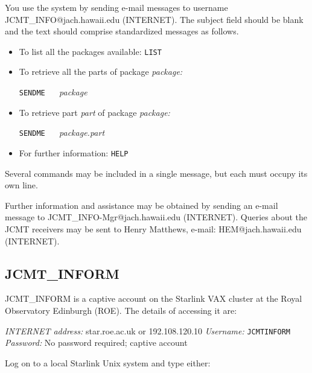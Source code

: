 \documentclass[twoside,11pt,nolof]{starlink}
\begin{document}
You use the system by sending e-mail messages to username
JCMT\_INFO@jach.hawaii.edu (INTERNET). The subject field should be blank
and the text should comprise standardized messages as follows.

\begin{itemize}

  \item To list all the packages available: \texttt{LIST}

  \item To retrieve all the parts of package \textit{package:}

  \vspace{2.0 mm}
   \texttt{SENDME} ~~ \textit{package}
  \vspace{2.0 mm}

  \item To retrieve part \textit{part} of package \textit{package:}

  \vspace{2.0 mm}
   \texttt{SENDME} ~~ \textit{package.part}
  \vspace{2.0 mm}

  \item For further information: \texttt{HELP}

\end{itemize}

Several commands may be included in a single message, but each must
occupy its own line.

Further information and assistance may be obtained by sending an e-mail
message to
\newline JCMT\_INFO-Mgr@jach.hawaii.edu (INTERNET).  Queries about the
JCMT receivers may be sent to Henry Matthews, e-mail:
HEM@jach.hawaii.edu (INTERNET).

\subsection{JCMT\_INFORM}

JCMT\_INFORM is a captive account on the Starlink VAX cluster at the
Royal Observatory Edinburgh (ROE). The details of accessing it are:

\textit{INTERNET address:} star.roe.ac.uk or 192.108.120.10
\newline \textit{Username:} \verb-JCMTINFORM-
\newline \textit{Password:} No password required; captive account

Log on to a local Starlink Unix system and type either:
\end{document}
